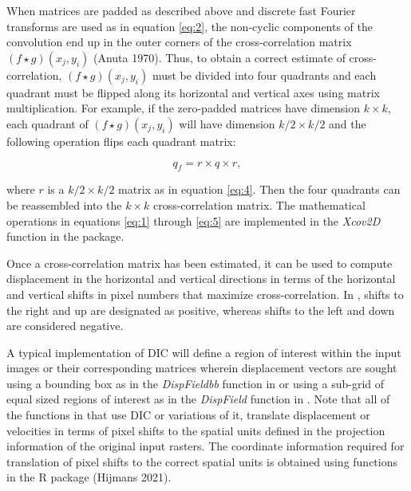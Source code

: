 When matrices are padded as described above and discrete fast Fourier transforms are used as in equation \eqref{eq:2}, the non-cyclic components of the convolution end up in the outer corners of the cross-correlation matrix \(\left(f \star g\right)\left(x_j, y_i\right)\) (Anuta 1970). Thus, to obtain a correct estimate of cross-correlation, \(\left(f \star g\right)\left(x_j, y_i\right)\) must be divided into four quadrants and each quadrant must be flipped along its horizontal and vertical axes using matrix multiplication. For example, if the zero-padded matrices have dimension \(k \times k\), each quadrant of \(\left(f \star g\right)\left(x_j, y_i\right)\) will have dimension \(k/2 \times k/2\) and the following operation flips each quadrant matrix:

\begin{equation}
q_f = r \times q \times r, 
\label{eq:5}
\end{equation}

\noindent where \(r\) is a \(k/2 \times k/2\) matrix as in equation \eqref{eq:4}. Then the four quadrants can be reassembled into the \(k \times k\) cross-correlation matrix. The mathematical operations in equations \eqref{eq:1} through \eqref{eq:5} are implemented in the \emph{Xcov2D} function in the  package.

Once a cross-correlation matrix has been estimated, it can be used to compute displacement in the horizontal and vertical directions in terms of the horizontal and vertical shifts in pixel numbers that maximize cross-correlation. In , shifts to the right and up are designated as positive, whereas shifts to the left and down are considered negative.

A typical implementation of DIC will define a region of interest within the input images or their corresponding matrices wherein displacement vectors are sought using a bounding box as in the \emph{DispFieldbb} function in  or using a sub-grid of equal sized regions of interest as in the \emph{DispField} function in . Note that all of the functions in  that use DIC or variations of it, translate displacement or velocities in terms of pixel shifts to the spatial units defined in the projection information of the original input rasters. The coordinate information required for translation of pixel shifts to the correct spatial units is obtained using functions in the  R package (Hijmans 2021).

